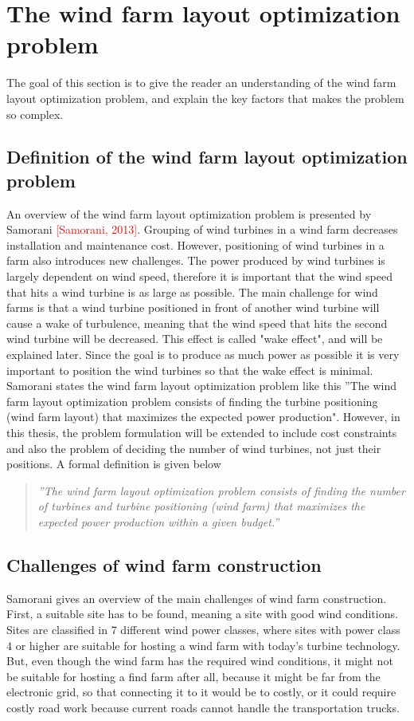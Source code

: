\documentclass{article}
\begin{document}
\section{The wind farm layout optimization problem}
The goal of this section is to give the reader an understanding of the wind farm layout optimization problem, and explain the key factors that makes the problem so complex.


\subsection{Definition of the wind farm layout optimization problem}
An overview of the wind farm layout optimization problem is presented by Samorani \textcolor{red}{[Samorani, 2013]}. Grouping of wind turbines in a wind farm decreases installation and maintenance cost. However, positioning of wind turbines in a farm also introduces new challenges. The power produced by wind turbines is largely dependent on wind speed, therefore it is important that the wind speed that hits a wind turbine is as large as possible. The main challenge for wind farms is that a wind turbine positioned in front of another wind turbine will cause a wake of turbulence, meaning that the wind speed that hits the second wind turbine will be decreased. This effect is called "wake effect", and will be explained later. Since the goal is to produce as much power as possible it is very important to position the wind turbines so that the wake effect is minimal. Samorani states the wind farm layout optimization problem like this ''The wind farm layout optimization problem consists of finding the turbine positioning (wind farm layout) that maximizes the expected power production". However, in this thesis, the problem formulation will be extended to include cost constraints and also the problem of deciding the number of wind turbines, not just their positions. A formal definition is given below


\begin{quote}
\textit{''The wind farm layout optimization problem consists of finding the number of turbines and turbine positioning (wind farm) that maximizes the expected power production within a given budget.''}
\end{quote}


\subsection{Challenges of wind farm construction}
Samorani gives an overview of the main challenges of wind farm construction. First, a suitable site has to be found, meaning a site with good wind conditions. Sites are classified in 7 different wind power classes, where sites with power class 4 or higher are suitable for hosting a wind farm with today's turbine technology. But, even though the wind farm has the required wind conditions, it might not be suitable for hosting a find farm after all, because it might be far from the electronic grid, so that connecting it to it would be to costly, or it could require costly road work because current roads cannot handle the transportation trucks.\\
\end{document}
